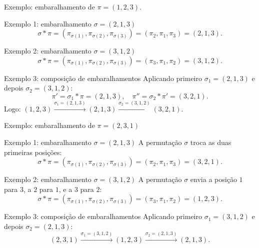 \documentclass{beamer}
\begin{document}
\begin{frame}{Exemplo:  embaralhamento de \(    \pi = (1,2,3).  \)}

  \begin{block}{Exemplo 1: embaralhamento $\sigma = (2,1,3)$}
    \[
      \sigma \ast \pi 
      = (\pi_{\sigma(1)}, \pi_{\sigma(2)}, \pi_{\sigma(3)})
      = (\pi_2, \pi_1, \pi_3)
      = (2,1,3).
    \]
  \end{block}
  
  \begin{block}{Exemplo 2: embaralhamento $\sigma = (3,1,2)$}
    \[
      \sigma \ast \pi 
      = (\pi_{\sigma(1)}, \pi_{\sigma(2)}, \pi_{\sigma(3)})
      = (\pi_3, \pi_1, \pi_2)
      = (3,1,2).
    \]
  \end{block}

  \begin{block}{Exemplo 3: composição de embaralhamentos}
    Aplicando primeiro $\sigma_1=(2,1,3)$ e depois $\sigma_2=(3,1,2)$:
    \[
      \pi' = \sigma_1 \ast \pi = (2,1,3),
      \quad
      \pi'' = \sigma_2 \ast \pi' = (3,2,1).
    \]
    Logo:
    \(
      (1,2,3) \xrightarrow{\sigma_1=(2,1,3)} (2,1,3) 
      \xrightarrow{\sigma_2=(3,1,2)} (3,2,1).
    \)
  \end{block}

\end{frame}

\begin{frame}{Exemplo: embaralhamento de $ \pi = (2,3,1)$ }

  \begin{block}{Exemplo 1: embaralhamento $\sigma = (2,1,3)$}
    A permutação $\sigma$ troca as duas primeiras posições:
    \[
      \sigma \ast \pi 
      = (\pi_{\sigma(1)}, \pi_{\sigma(2)}, \pi_{\sigma(3)})
      = (\pi_2, \pi_1, \pi_3)
      = (3,2,1).
    \]
  \end{block}

  \begin{block}{Exemplo 2: embaralhamento $\sigma = (3,1,2)$}
    A permutação $\sigma$ envia a posição $1$ para $3$, a $2$ para $1$, e a $3$ para $2$:
    \[
      \sigma \ast \pi 
      = (\pi_{\sigma(1)}, \pi_{\sigma(2)}, \pi_{\sigma(3)})
      = (\pi_3, \pi_1, \pi_2)
      = (1,2,3).
    \]
  \end{block}

  \begin{block}{Exemplo 3: composição de embaralhamentos}
    Aplicando primeiro $\sigma_1=(3,1,2)$ e depois $\sigma_2=(2,1,3)$:
    \[
      (2,3,1) \xrightarrow{\sigma_1=(3,1,2)} (1,2,3)
      \xrightarrow{\sigma_2=(2,1,3)} (2,1,3).
    \]
  \end{block}

\end{frame}
\end{document}
